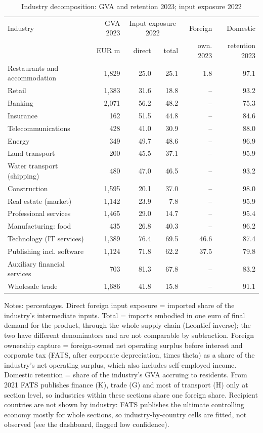 \begin{table}[!htbp]
\centering
\small
\caption{Industry decomposition: GVA and retention 2023; input exposure 2022}
\label{tab:industries}
\begin{tabular}{>{\raggedright\arraybackslash}p{}rrrrr}
\toprule
Industry & GVA 2023 & \multicolumn{2}{c}{Input exposure 2022} & Foreign & Domestic \\
 & EUR m & direct & total & own. 2023 & retention 2023 \\
\midrule
Restaurants and accommodation & 1,829 & 25.0 & 25.1 & 1.8 & 97.1 \\
Retail & 1,383 & 31.6 & 18.8 & -- & 93.2 \\
Banking & 2,071 & 56.2 & 48.2 & -- & 75.3 \\
Insurance & 162 & 51.5 & 44.8 & -- & 84.6 \\
Telecommunications & 428 & 41.0 & 30.9 & -- & 88.0 \\
Energy & 349 & 49.7 & 48.6 & -- & 96.9 \\
Land transport & 200 & 45.5 & 37.1 & -- & 95.9 \\
Water transport (shipping) & 480 & 47.0 & 46.5 & -- & 93.2 \\
Construction & 1,595 & 20.1 & 37.0 & -- & 98.0 \\
Real estate (market) & 1,142 & 23.9 & 7.8 & -- & 95.9 \\
Professional services & 1,465 & 29.0 & 14.7 & -- & 95.4 \\
Manufacturing: food & 435 & 26.8 & 40.3 & -- & 96.2 \\
Technology (IT services) & 1,389 & 76.4 & 69.5 & 46.6 & 87.4 \\
Publishing incl. software & 1,124 & 71.8 & 62.2 & 37.5 & 79.8 \\
Auxiliary financial services & 703 & 81.3 & 67.8 & -- & 83.2 \\
Wholesale trade & 1,686 & 41.8 & 15.8 & -- & 91.1 \\
\bottomrule
\end{tabular}

\smallskip
\begin{minipage}{0.95\textwidth}\footnotesize
Notes: percentages. Direct foreign input exposure = imported share of the industry's intermediate inputs. Total = imports embodied in one euro of final demand for the product, through the whole supply chain (Leontief inverse); the two have different denominators and are not comparable by subtraction. Foreign ownership capture = foreign-owned net operating surplus before interest and corporate tax (FATS, after corporate depreciation, times theta) as a share of the industry's net operating surplus, which also includes self-employed income. Domestic retention = share of the industry's GVA accruing to residents. From 2021 FATS publishes finance (K), trade (G) and most of transport (H) only at section level, so industries within these sections share one foreign share. Recipient countries are not shown by industry: FATS publishes the ultimate controlling economy mostly for whole sections, so industry-by-country cells are fitted, not observed (see the dashboard, flagged low confidence).
\end{minipage}
\end{table}
